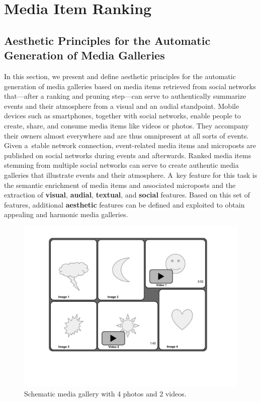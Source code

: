 \chapter{Media Item Ranking}
\label{sec:media-item-ranking}

\ifpdf
    \graphicspath{{7_media_item_ranking/figures/PNG/}{7_media_item_ranking/figures/PDF/}{7_media_item_ranking/figures/}}
\else
    \graphicspath{{7_media_item_ranking/figures/EPS/}{7_media_item_ranking/figures/}}
\fi


\section{Aesthetic Principles for the Automatic Generation of Media Galleries}
In this section, we present and define aesthetic principles
for the automatic generation of media galleries
based on media items retrieved from social networks
that---after a ranking and pruning step---can serve to authentically
summarize events and their atmosphere from a visual
and an audial standpoint.
Mobile devices such as smartphones, together with social networks,
enable people to create, share, and consume media items
like videos or photos.
They accompany their owners almost everywhere
and are thus omnipresent at all sorts of events.
Given a~stable network connection, event-related media items
and microposts are published on social networks
during events and afterwards.
Ranked media items stemming from multiple social networks
can serve to create authentic media galleries
that illustrate events and their atmosphere.
A~key feature for this task is the semantic enrichment
of media items and associated microposts
and the extraction of \textbf{visual}, \textbf{audial},
\textbf{textual}, and \textbf{social} features.
Based on this set of features,
additional \textbf{aesthetic} features
can be defined and exploited to obtain appealing
and harmonic media galleries.

\begin{figure}[htb]
\centering
\includegraphics[trim=20mm 40mm 20mm 10mm, clip, width=0.75\columnwidth]{media-gallery.pdf}
\caption{Schematic media gallery with 4 photos and 2 videos.}
\label{fig:media-gallery}
\end{figure}

